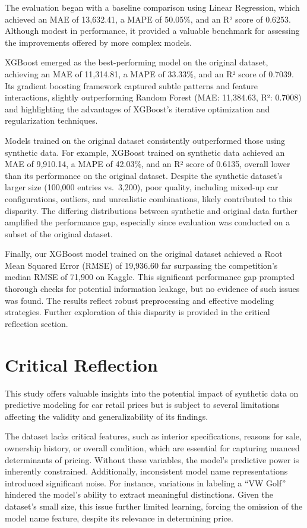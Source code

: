 \documentclass[a4paper,oneside,bibliography=totoc]{scrbook}
\begin{document}
The evaluation began with a baseline comparison using Linear Regression, which achieved an MAE of 13,632.41, a MAPE of 50.05\%, and an R² score of 0.6253. Although modest in performance, it provided a valuable benchmark for assessing the improvements offered by more complex models.

XGBoost emerged as the best-performing model on the original dataset, achieving an MAE of 11,314.81, a MAPE of 33.33\%, and an R² score of 0.7039. Its gradient boosting framework captured subtle patterns and feature interactions, slightly outperforming Random Forest (MAE: 11,384.63, R²: 0.7008) and highlighting the advantages of XGBoost's iterative optimization and regularization techniques.

Models trained on the original dataset consistently outperformed those using synthetic data. For example, XGBoost trained on synthetic data achieved an MAE of 9,910.14, a MAPE of 42.03\%, and an R² score of 0.6135, overall lower than its performance on the original dataset. Despite the synthetic dataset's larger size (100,000 entries vs.~3,200), poor quality, including mixed-up car configurations, outliers, and unrealistic combinations, likely contributed to this disparity. The differing distributions between synthetic and original data further amplified the performance gap, especially since evaluation was conducted on a subset of the original dataset.

Finally, our XGBoost model trained on the original dataset achieved a Root Mean Squared Error (RMSE) of 19,936.60 far surpassing the competition's median RMSE of 71,900 on Kaggle. This significant performance gap prompted thorough checks for potential information leakage, but no evidence of such issues was found. The results reflect robust preprocessing and effective modeling strategies. Further exploration of this disparity is provided in the critical reflection section.

\chapter{Critical Reflection}
\label{cha:criticalReflection}

This study offers valuable insights into the potential impact of synthetic data on predictive modeling for car retail prices but is subject to several limitations affecting the validity and generalizability of its findings.

The dataset lacks critical features, such as interior specifications, reasons for sale, ownership history, or overall condition, which are essential for capturing nuanced determinants of pricing. Without these variables, the model's predictive power is inherently constrained. Additionally, inconsistent model name representations introduced significant noise. For instance, variations in labeling a ``VW Golf'' hindered the model's ability to extract meaningful distinctions. Given the dataset's small size, this issue further limited learning, forcing the omission of the model name feature, despite its relevance in determining price.
\end{document}
